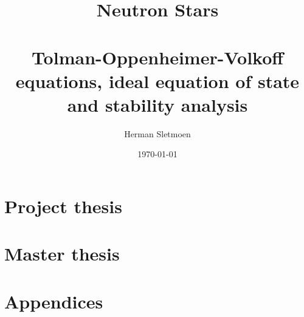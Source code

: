 \documentclass[a4paper,11pt,twoside,openany]{book}
\title{%
	Neutron Stars \\ \ \\
	\normalsize Tolman-Oppenheimer-Volkoff equations, ideal equation of state and stability analysis
}
\author{Herman Sletmoen}
\date{\today}
\newcommand{\1}{\mathds{1}}
\begin{document}
\frontmatter
\begin{titlepage}
\end{titlepage}



\tableofcontents


\mainmatter
\part{Project thesis} \label{part:project}





\part{Master thesis} \label{part:master}






\part{Appendices} \label{part:appendices}


\backmatter
\printbibliography[heading=bibintoc, title={References}]

\cleartoevenpage %

\end{document}

